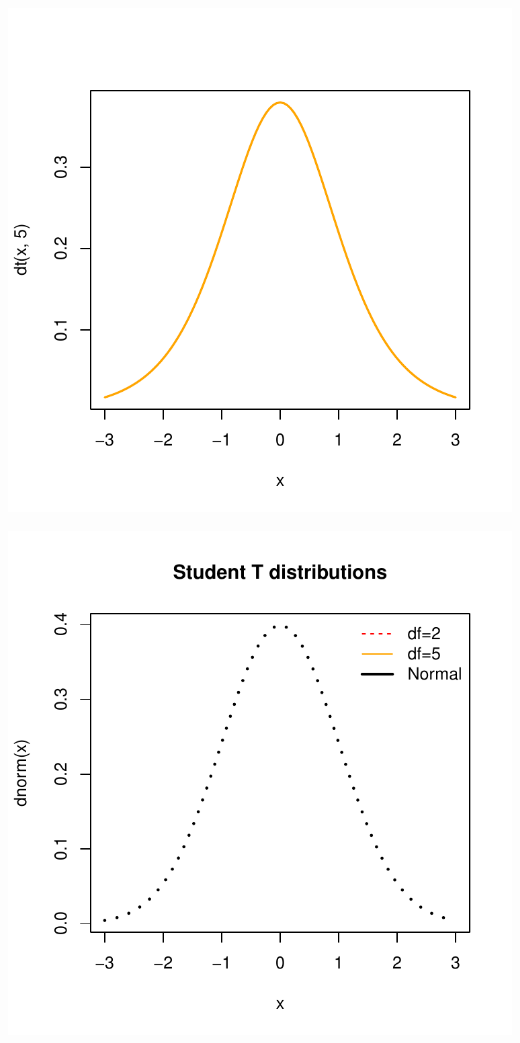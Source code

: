 \documentclass[]{book}
\theoremstyle{definition}
\theoremstyle{definition}
\theoremstyle{definition}
\theoremstyle{remark}
\begin{document}
\begin{center}\includegraphics{bookdown-demo_files/figure-latex/unnamed-chunk-58-2} \end{center}

\begin{center}\includegraphics{bookdown-demo_files/figure-latex/unnamed-chunk-58-3} \end{center}
\end{document}
